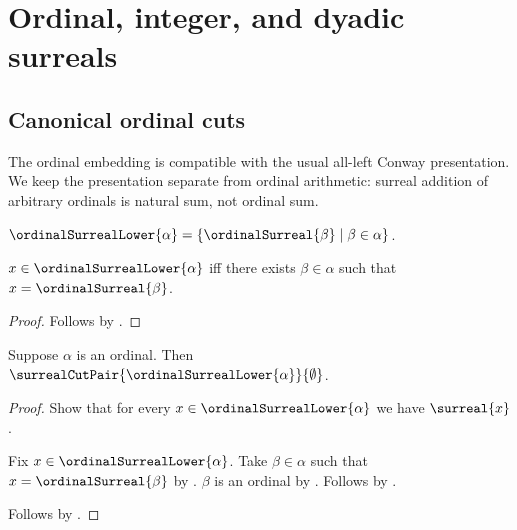 


\section{Ordinal, integer, and dyadic surreals}

\subsection{Canonical ordinal cuts}

The ordinal embedding is compatible with the usual all-left Conway
presentation.  We keep the presentation separate from ordinal arithmetic:
surreal addition of arbitrary ordinals is natural sum, not ordinal sum.

\begin{definition}\label{ordinal_surreal_lower}
    $\ordinalSurrealLower{\alpha}=
        \{\ordinalSurreal{\beta}\mid\beta\in\alpha\}$.
\end{definition}

\begin{proposition}\label{ordinal_surreal_lower_iff}
    $x\in\ordinalSurrealLower{\alpha}$ iff there exists $\beta\in\alpha$
        such that $x=\ordinalSurreal{\beta}$.
\end{proposition}
\begin{proof}
    Follows by .
\end{proof}

\begin{proposition}\label{ordinal_surreal_lower_cut_pair}
    Suppose $\alpha$ is an ordinal.
    Then $\surrealCutPair{\ordinalSurrealLower{\alpha}}{\emptyset}$.
\end{proposition}
\begin{proof}
    Show that for every $x\in\ordinalSurrealLower{\alpha}$ we have
        $\surreal{x}$.
    \begin{subproof}
        Fix $x\in\ordinalSurrealLower{\alpha}$.
        Take $\beta\in\alpha$ such that
            $x=\ordinalSurreal{\beta}$
            by .
        $\beta$ is an ordinal by .
        Follows by .
    \end{subproof}
    Follows by .
\end{proof}

